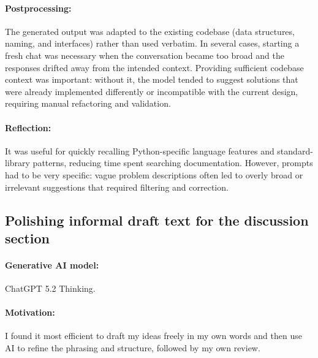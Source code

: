 \documentclass[a4paper,10pt]{article}
\begin{document}
\paragraph{Postprocessing:}
The generated output was adapted to the existing codebase (data structures, naming, and interfaces) rather than
used verbatim. In several cases, starting a fresh chat was necessary when the conversation became too broad and
the responses drifted away from the intended context. Providing sufficient codebase context was important:
without it, the model tended to suggest solutions that were already implemented differently or incompatible with
the current design, requiring manual refactoring and validation.


\paragraph{Reflection:}
It was useful for quickly recalling Python-specific language features and standard-library patterns, reducing time
spent searching documentation. However, prompts had to be very specific: vague problem descriptions often led to
overly broad or irrelevant suggestions that required filtering and correction.

\subsection{Polishing informal draft text for the discussion section}

\paragraph{Generative AI model:} ChatGPT 5.2 Thinking.

\paragraph{Motivation:} I found it most efficient to draft my ideas freely in my own words and then use AI to refine the phrasing and structure, followed by my own review.
\end{document}
